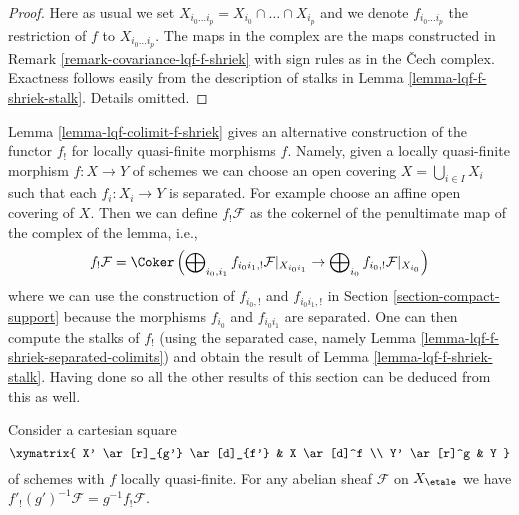 \begin{proof}
Here as usual we set $X_{i_0 \ldots i_p} = X_{i_0} \cap \ldots \cap X_{i_p}$
and we denote $f_{i_0 \ldots i_p}$ the restriction of $f$ to
$X_{i_0 \ldots i_p}$. The maps in the complex are the maps
constructed in Remark \ref{remark-covariance-lqf-f-shriek}
with sign rules as in the {\v C}ech complex.
Exactness follows easily from the description of stalks in
Lemma \ref{lemma-lqf-f-shriek-stalk}. Details omitted.
\end{proof}

\begin{remark}
\label{remark-alternative-lqf-f-shriek}
Lemma \ref{lemma-lqf-colimit-f-shriek}
gives an alternative construction of the functor $f_!$
for locally quasi-finite morphisms $f$.
Namely, given a locally quasi-finite morphism $f : X \to Y$ of schemes
we can choose an open covering $X = \bigcup_{i \in I} X_i$
such that each $f_i : X_i \to Y$ is separated. For example choose
an affine open covering of $X$. Then we
can define $f_!\mathcal{F}$ as the cokernel of the penultimate map
of the complex of the lemma, i.e.,
$$
f_!\mathcal{F} = \Coker\left(
\bigoplus\nolimits_{i_0, i_1} f_{i_0i_1, !} \mathcal{F}|_{X_{i_0i_1}} \to
\bigoplus\nolimits_{i_0} f_{i_0, !} \mathcal{F}|_{X_{i_0}}
\right)
$$
where we can use the construction of $f_{i_0, !}$ and
$f_{i_0i_1, !}$ in Section \ref{section-compact-support}
because the morphisms $f_{i_0}$ and $f_{i_0 i_1}$ are separated.
One can then compute the stalks of $f_!$ (using the separated
case, namely Lemma \ref{lemma-lqf-f-shriek-separated-colimits})
and obtain the result of Lemma \ref{lemma-lqf-f-shriek-stalk}.
Having done so all the other results of this section can be
deduced from this as well.
\end{remark}

\begin{lemma}
\label{lemma-lqf-base-change-f-shriek}
Consider a cartesian square
$$
\xymatrix{
X' \ar[r]_{g'} \ar[d]_{f'} & X \ar[d]^f \\
Y' \ar[r]^g & Y
}
$$
of schemes with $f$ locally quasi-finite. For any abelian sheaf $\mathcal{F}$
on $X_\etale$ we have $f'_!(g')^{-1}\mathcal{F} = g^{-1}f_!\mathcal{F}$.
\end{lemma}


